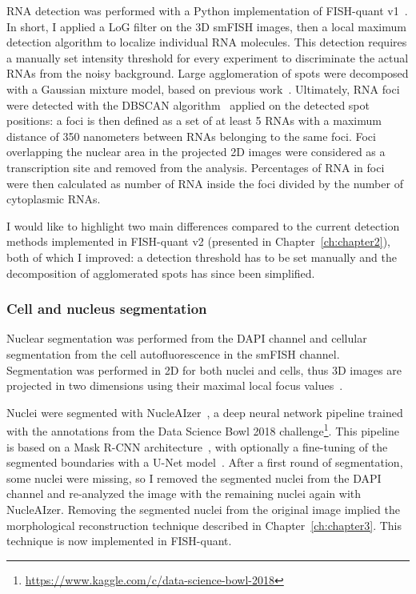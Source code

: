\ac{RNA} detection was performed with a Python implementation of FISH-quant v1~\cite{mueller_fish-quant_2013}.
In short, I applied a \ac{LoG} filter on the 3D \ac{smFISH} images, then a local maximum detection algorithm to localize individual RNA molecules.
This detection requires a manually set intensity threshold for every experiment to discriminate the actual RNAs from the noisy background.
Large agglomeration of spots were decomposed with a Gaussian mixture model, based on previous work~\cite{samacoits_computational_2018}.
Ultimately, \ac{RNA} foci were detected with the DBSCAN algorithm~\cite{ester_density-based_1996} applied on the detected spot positions: a foci is then defined as a set of at least 5 RNAs  with a maximum distance of 350 nanometers between RNAs belonging to the same foci.
Foci overlapping the nuclear area in the projected 2D images were considered as a transcription site and removed from the analysis.
Percentages of \ac{RNA} in foci were then calculated as number of \ac{RNA} inside the foci divided by the number of cytoplasmic \ac{RNA}s.

I would like to highlight two main differences compared to the current detection methods implemented in FISH-quant v2 (presented in Chapter~\ref{ch:chapter2}), both of which I improved: a detection threshold has to be set manually and the decomposition of agglomerated spots has since been simplified.

\subsubsection{Cell and nucleus segmentation}

Nuclear segmentation was performed from the DAPI channel and cellular segmentation from the cell autofluorescence in the \ac{smFISH} channel.
Segmentation was performed in 2D for both nuclei and cells, thus 3D images are projected in two dimensions using their maximal local focus values~\cite{tsanov_smifish_2016}.

Nuclei were segmented with NucleAIzer~\cite{hollandi_nucleaizer_2020}, a deep neural network pipeline trained with the annotations from the Data Science Bowl 2018 challenge\footnote{\url{https://www.kaggle.com/c/data-science-bowl-2018}}.
This pipeline is based on a Mask R-CNN architecture~\cite{He_2017_ICCV}, with optionally a fine-tuning of the segmented boundaries with a U-Net model~\cite{Ronneberger_2015}.
After a first round of segmentation, some nuclei were missing, so I removed the segmented nuclei from the DAPI channel and re-analyzed the image with the remaining nuclei again with NucleAIzer.
Removing the segmented nuclei from the original image implied the morphological reconstruction technique described in Chapter~\ref{ch:chapter3}.
This technique is now implemented in FISH-quant.

